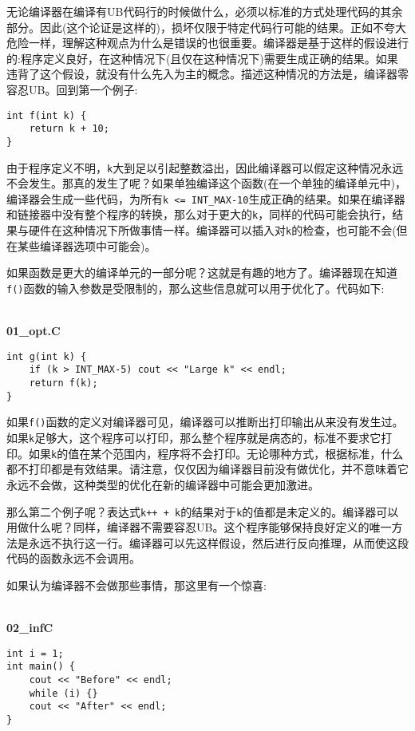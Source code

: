 无论编译器在编译有UB代码行的时候做什么，必须以标准的方式处理代码的其余部分。因此(这个论证是这样的)，损坏仅限于特定代码行可能的结果。正如不夸大危险一样，理解这种观点为什么是错误的也很重要。编译器是基于这样的假设进行的:程序定义良好，在这种情况下(且仅在这种情况下)需要生成正确的结果。如果违背了这个假设，就没有什么先入为主的概念。描述这种情况的方法是，编译器零容忍UB。回到第一个例子:

\begin{lstlisting}[style=styleCXX]
int f(int k) {
	return k + 10;
}
\end{lstlisting}

由于程序定义不明，\texttt{k}大到足以引起整数溢出，因此编译器可以假定这种情况永远不会发生。那真的发生了呢？如果单独编译这个函数(在一个单独的编译单元中)，编译器会生成一些代码，为所有\texttt{k <= INT\_MAX-10}生成正确的结果。如果在编译器和链接器中没有整个程序的转换，那么对于更大的\texttt{k}，同样的代码可能会执行，结果与硬件在这种情况下所做事情一样。编译器可以插入对\texttt{k}的检查，也可能不会(但在某些编译器选项中可能会)。

如果函数是更大的编译单元的一部分呢？这就是有趣的地方了。编译器现在知道\texttt{f()}函数的输入参数是受限制的，那么这些信息就可以用于优化了。代码如下:

\hspace*{\fill} \\ %
\noindent
\textbf{01\_opt.C}
\begin{lstlisting}[style=styleCXX]
int g(int k) {
	if (k > INT_MAX-5) cout << "Large k" << endl;
	return f(k);
}
\end{lstlisting}

如果\texttt{f()}函数的定义对编译器可见，编译器可以推断出打印输出从来没有发生过。如果\texttt{k}足够大，这个程序可以打印，那么整个程序就是病态的，标准不要求它打印。如果\texttt{k}的值在某个范围内，程序将不会打印。无论哪种方式，根据标准，什么都不打印都是有效结果。请注意，仅仅因为编译器目前没有做优化，并不意味着它永远不会做，这种类型的优化在新的编译器中可能会更加激进。

那么第二个例子呢？表达式\texttt{k++ + k}的结果对于\texttt{k}的值都是未定义的。编译器可以用做什么呢？同样，编译器不需要容忍UB。这个程序能够保持良好定义的唯一方法是永远不执行这一行。编译器可以先这样假设，然后进行反向推理，从而使这段代码的函数永远不会调用。

如果认为编译器不会做那些事情，那这里有一个惊喜:

\hspace*{\fill} \\ %
\noindent
\textbf{02\_infC}
\begin{lstlisting}[style=styleCXX]
int i = 1;
int main() {
	cout << "Before" << endl;
	while (i) {}
	cout << "After" << endl;
}
\end{lstlisting}

